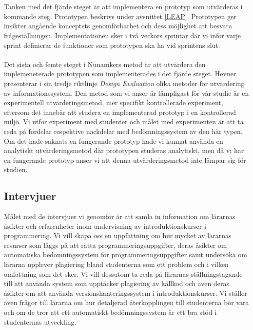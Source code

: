 \documentclass[a4paper,11pt]{article}
\begin{document}
{\\
\\
Tanken med det fjärde steget är att implementera en prototyp som utvärderas i kommande steg. Prototypen beskrivs under avsnittet \ref{LEAP}. Prototypen ger insikter angående konceptets genomförbarhet och dess möjlighet att besvara frågeställningen. Implementationen sker i två veckors sprintar där vi inför varje sprint definierar de funktioner som prototypen ska ha vid sprintens slut.
\\
\\
Det sista och femte steget i Nunamkers metod är att utvärdera den implemeneterade prototypen som implementerades i det fjärde steget. Hevner \cite{hevner} presenterar i sin tredje riktlinje \textit{Design Evaluation} olika metoder för utvärdering av informationssystem. Den metod som vi anser är lämpligast för vår studie är en experimentell utvärderingsmetod, mer specifikt kontrollerade experiment, eftersom det innebär att studera en implementerad prototyp i en kontrollerad miljö. Vi utför experiment med studenter och målet med experimenten är att ta reda på fördelar respektive nackdelar med bedömningssystem av den här typen. 
\\
Om det hade saknats en fungerande prototyp hade vi kunnat använda en analytiskt utvärderingsmetod där prototypen studeras analytiskt, men då vi har en fungerande prototyp anser vi att denna utvärderingsmetod inte lämpar sig för studien.

\newpage
\subsection{Intervjuer}\label{Intervjuer}

Målet med de intervjuer vi genomför är att samla in information om lärarnas åsikter och erfarenheter inom undervisning av introduktionskurser i programmering. Vi vill skapa oss en uppfattning om hur mycket av lärarnas resurser som läggs på att rätta programmeringsuppgifter, deras åsikter om automatiska bedömningssystem för programmeringsuppgifter samt undersöka om lärarna upplever plagiering bland studenterna som ett problem och i vilken omfattning som det sker. Vi vill dessutom ta reda på lärarnas ställningstagande till att använda system som upptäcker plagiering av källkod och även deras åsikter om att använda versionshanteringssystem i introduktionskurser. Vi ställer även frågor till lärarna om hur detaljerad återkopplingen till studenterna bör vara och om de tror att ett automatiskt bedömningssystem är ett bra stöd i studenternas utveckling.

}
\end{document}
